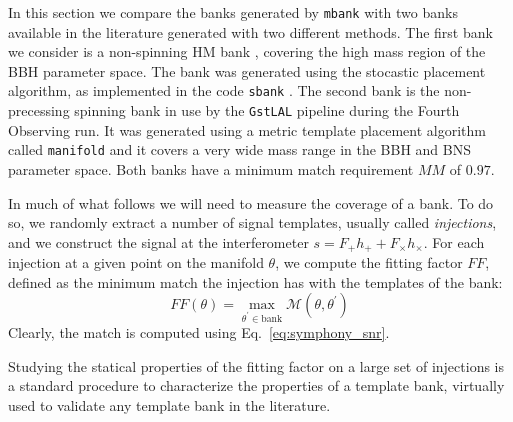 \documentclass[twocolumn,showpacs,preprintnumbers,nofootinbib,prd,
superscriptaddress,10pt]{revtex4-2}
\begin{document}
In this section we compare the banks generated by \texttt{mbank} with two banks available in the literature generated with two different methods.
The first bank we consider is a non-spinning HM bank \cite{Harry:2017weg}, covering the high mass region of the BBH parameter space. The bank was generated using the stocastic placement algorithm, as implemented in the code \texttt{sbank} \cite{Ajith:2012mn}.
The second bank is the non-precessing spinning bank \cite{Sakon:2022ibh} in use by the \texttt{GstLAL} pipeline \cite{PhysRevD.95.042001, gstlal_paper2} during the Fourth Observing run. It was generated using a metric template placement algorithm called \texttt{manifold} \cite{Hanna:2022zpk} and it covers a very wide mass range in the BBH and BNS parameter space.
Both banks have a minimum match requirement $MM$ of $0.97$.

In much of what follows we will need to measure the coverage of a bank. To do so, we randomly extract a number of signal templates, usually called {\it injections}, and we construct the signal at the interferometer ${s = F_+h_+ + F_\times h_\times}$.
For each injection at a given point on the manifold $\theta$, we compute the fitting factor $FF$, defined as the minimum match the injection has with the templates of the bank:
\begin{equation}\label{eq:FF}
	FF(\theta) = \max_{\theta^\prime \in \text{bank}} \mathcal{M}(\theta, \theta^\prime)
\end{equation}
Clearly, the match is computed using Eq.~\eqref{eq:symphony_snr}.

Studying the statical properties of the fitting factor on a large set of injections is a standard procedure to characterize the properties of a template bank, virtually used to validate any template bank in the literature.
\end{document}
